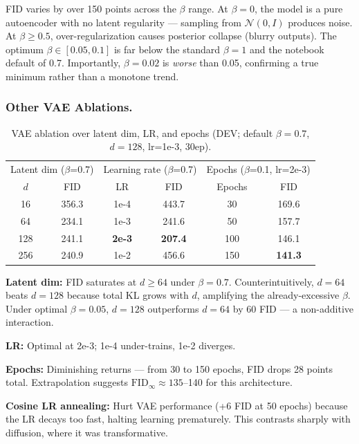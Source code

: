 \documentclass[runningheads]{llncs}
\begin{document}
FID varies by over 150 points across the $\beta$ range. At $\beta=0$, the model is a pure autoencoder with no latent regularity --- sampling from $\mathcal{N}(0,I)$ produces noise. At $\beta \geq 0.5$, over-regularization causes posterior collapse (blurry outputs). The optimum $\beta \in [0.05, 0.1]$ is far below the standard $\beta=1$ and the notebook default of 0.7. Importantly, $\beta=0.02$ is \emph{worse} than 0.05, confirming a true minimum rather than a monotone trend.

\subsubsection{Other VAE Ablations.}

\begin{table}[htbp]
\caption{VAE ablation over latent dim, LR, and epochs (DEV; default $\beta=0.7$, $d=128$, lr=1e-3, 30ep).}\label{tab:vae_other}
\centering\small
\begin{tabular}{cc|cc|cc}
\toprule
\multicolumn{2}{c|}{Latent dim ($\beta$=0.7)} & \multicolumn{2}{c|}{Learning rate ($\beta$=0.7)} & \multicolumn{2}{c}{Epochs ($\beta$=0.1, lr=2e-3)} \\
$d$ & FID & LR & FID & Epochs & FID \\
\midrule
16  & 356.3 & 1e-4 & 443.7 & 30  & 169.6 \\
64  & 234.1 & 1e-3 & 241.6 & 50  & 157.7 \\
128 & 241.1 & \textbf{2e-3} & \textbf{207.4} & 100 & 146.1 \\
256 & 240.9 & 1e-2 & 456.6 & 150 & \textbf{141.3} \\
\bottomrule
\end{tabular}
\end{table}

\textbf{Latent dim:} FID saturates at $d \geq 64$ under $\beta=0.7$. Counterintuitively, $d=64$ beats $d=128$ because total KL grows with $d$, amplifying the already-excessive $\beta$. Under optimal $\beta=0.05$, $d=128$ outperforms $d=64$ by 60 FID --- a non-additive interaction.

\textbf{LR:} Optimal at 2e-3; 1e-4 under-trains, 1e-2 diverges.

\textbf{Epochs:} Diminishing returns --- from 30 to 150 epochs, FID drops 28 points total. Extrapolation suggests $\text{FID}_\infty \approx 135$--140 for this architecture.

\textbf{Cosine LR annealing:} Hurt VAE performance (+6 FID at 50 epochs) because the LR decays too fast, halting learning prematurely. This contrasts sharply with diffusion, where it was transformative.
\end{document}
